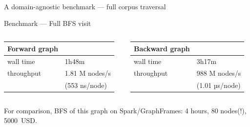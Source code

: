 \documentclass[aspectratio=169,xcolor=table]{beamer}
\begin{document}
    \begin{frame}{A domain-agnostic benchmark --- full corpus traversal}
        \begin{block}{Benchmark --- Full BFS visit}
            \begin{columns}\begin{column}{0.45\textwidth}
                \begin{center}
                    \begin{tabular}{ll}
                        \alert{Forward  graph} & \\
                        \hline
                        wall time & 1h48m\\
                        throughput & 1.81 M nodes/s\\
                                   & (553 ns/node)\\
                    \end{tabular}
                \end{center}
                \end{column}\begin{column}{0.45\textwidth}
                \begin{center}
                    \begin{tabular}{ll}
                        \alert{Backward graph} & \\
                        \hline
                        wall time & 3h17m\\
                        throughput & 988 M nodes/s\\
                                   & (1.01 µs/node)\\
                    \end{tabular}
                \end{center}
            \end{column}\end{columns}
        \end{block}
        For comparison, BFS of this graph on Spark/GraphFrames: 4 hours, 80
        nodes(!), 5000~USD.
    \end{frame}
\end{document}
